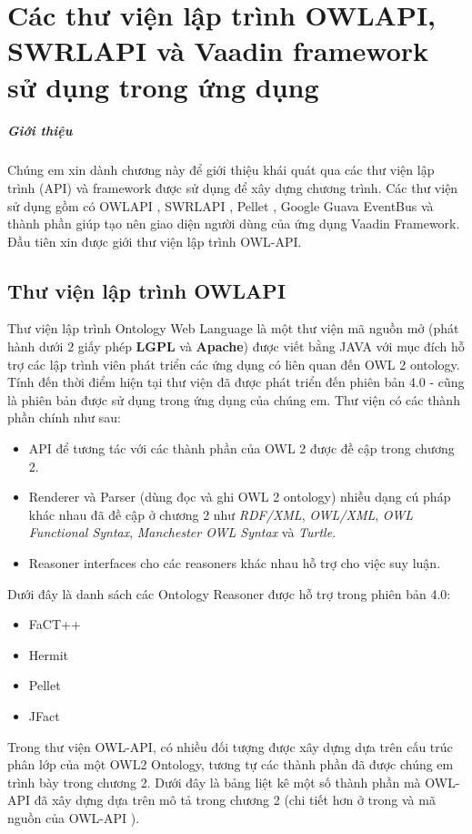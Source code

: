 \chapter{Các thư viện lập trình OWLAPI, SWRLAPI và Vaadin framework sử dụng trong ứng dụng}
\paragraph{Giới thiệu} Chúng em xin dành chương này để giới thiệu khái quát qua các thư viện lập trình (API) và framework được sử dụng để xây dựng chương trình. Các thư viện sử dụng gồm có OWLAPI \cite{owlapi}, SWRLAPI \cite{swrlapi}, Pellet \cite{pellet}, Google Guava EventBus và thành phần giúp tạo nên giao diện người dùng của ứng dụng Vaadin Framework. Đầu tiên xin được giới thư viện lập trình OWL-API.
\section{Thư viện lập trình OWLAPI}
Thư viện lập trình Ontology Web Language là một thư viện mã nguồn mở (phát hành dưới 2 giấy phép \textbf{LGPL} và \textbf{Apache}) \cite{owlapi} được viết bằng JAVA với mục đích hỗ trợ các lập trình viên phát triển các ứng dụng có liên quan đến OWL 2 ontology. Tính đến thời điểm hiện tại thư viện đã được phát triển đến phiên bản 4.0 - cũng là phiên bản được sử dụng trong ứng dụng của chúng em.
Thư viện có các thành phần chính như sau: 
\begin{itemize}
\item API để tương tác với các thành phần của OWL 2 được đề cập trong chương 2.
\item Renderer và Parser (dùng đọc và ghi OWL 2 ontology) nhiều dạng cú pháp khác nhau đã đề cập ở chương 2 như \textit{RDF/XML}, \textit{OWL/XML}, \textit{OWL Functional Syntax}, \textit{Manchester OWL Syntax} và \textit{Turtle}.
\item Reasoner interfaces cho các reasoners khác nhau hỗ trợ cho việc suy luận.
\end{itemize}
Dưới đây là danh sách các Ontology Reasoner được hỗ trợ trong phiên bản 4.0:
\begin{itemize}
\item FaCT++ 
\item Hermit
\item Pellet \cite{pellet}
\item JFact 
\end{itemize}
Trong thư viện OWL-API, có nhiều đối tượng được xây dựng dựa trên cấu trúc phân lớp của một OWL2 Ontology, tương tự các thành phần đã được chúng em trình bày trong chương 2. Dưới đây là bảng liệt kê một số thành phần mà OWL-API đã xây dựng dựa trên mô tả trong chương 2 (chi tiết hơn ở trong \cite{owl2spec} và mã nguồn của OWL-API \cite{owlapi}).
